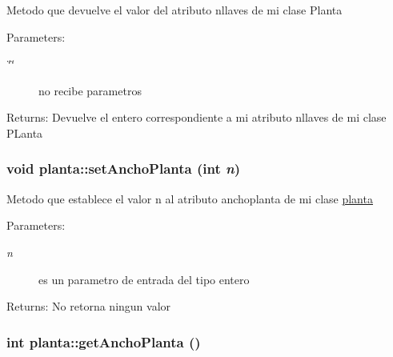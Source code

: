 Metodo que devuelve el valor del atributo nllaves de mi clase Planta \begin{Desc}
\item[Parameters:]
\begin{description}
\item[{\em \char`\"{}\char`\"{}}]no recibe parametros \end{description}
\end{Desc}
\begin{Desc}
\item[Returns:]Devuelve el entero correspondiente a mi atributo nllaves de mi clase PLanta \end{Desc}
\hypertarget{classplanta_aa7dd29c052394b78b67d7be90bbb3c3}{
\subsubsection[setAnchoPlanta]{\setlength{\rightskip}{0pt plus 5cm}void planta::setAnchoPlanta (int {\em n})}}
\label{classplanta_aa7dd29c052394b78b67d7be90bbb3c3}


Metodo que establece el valor n al atributo anchoplanta de mi clase \hyperlink{classplanta}{planta} \begin{Desc}
\item[Parameters:]
\begin{description}
\item[{\em n}]es un parametro de entrada del tipo entero \end{description}
\end{Desc}
\begin{Desc}
\item[Returns:]No retorna ningun valor \end{Desc}
\hypertarget{classplanta_ef93598d5bca7e2235035a07147f4bbe}{
\subsubsection[getAnchoPlanta]{\setlength{\rightskip}{0pt plus 5cm}int planta::getAnchoPlanta ()}}
\label{classplanta_ef93598d5bca7e2235035a07147f4bbe}


